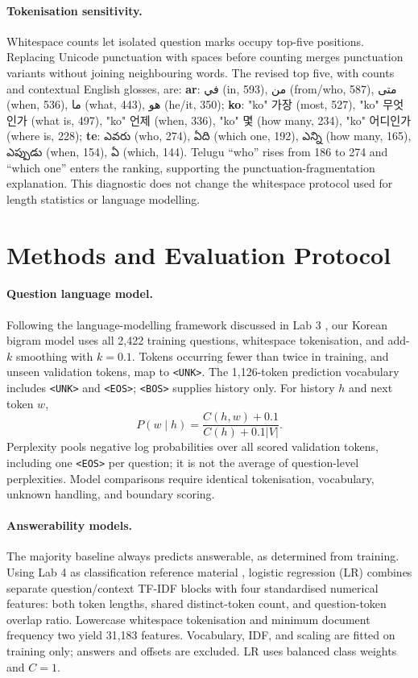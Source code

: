 \documentclass[11pt]{article}
\newcommand{\KO}[1]{{\koreanfont\XeTeXlinebreaklocale "ko" #1}}
\newcommand{\TE}[1]{{\telugufont #1}}
\newcommand{\AR}[1]{{\arabicfont\beginR #1\endR}}
\newcommand{\unk}{\texttt{<UNK>}}
\newcommand{\bos}{\texttt{<BOS>}}
\newcommand{\eos}{\texttt{<EOS>}}
\begin{document}
\paragraph{Tokenisation sensitivity.}
Whitespace counts let isolated question marks occupy top-five positions. Replacing Unicode punctuation with spaces before counting merges punctuation variants without joining neighbouring words. The revised top five, with counts and contextual English glosses, are:
\textbf{ar}: \AR{في} (in, 593), \AR{من} (from/who, 587), \AR{متى} (when, 536), \AR{ما} (what, 443), \AR{هو} (he/it, 350);
\textbf{ko}: \KO{가장} (most, 527), \KO{무엇인가} (what is, 497), \KO{언제} (when, 336), \KO{몇} (how many, 234), \KO{어디인가} (where is, 228);
\textbf{te}: \TE{ఎవరు} (who, 274), \TE{ఏది} (which one, 192), \TE{ఎన్ని} (how many, 165), \TE{ఎప్పుడు} (when, 154), \TE{ఏ} (which, 144).
Telugu ``who'' rises from 186 to 274 and ``which one'' enters the ranking, supporting the punctuation-fragmentation explanation. This diagnostic does not change the whitespace protocol used for length statistics or language modelling.

\section{Methods and Evaluation Protocol}
\paragraph{Question language model.}
Following the language-modelling framework discussed in Lab 3 \citep{lab3}, our Korean bigram model uses all 2,422 training questions, whitespace tokenisation, and add-$k$ smoothing with $k=0.1$. Tokens occurring fewer than twice in training, and unseen validation tokens, map to \unk{}. The 1,126-token prediction vocabulary includes \unk{} and \eos{}; \bos{} supplies history only. For history $h$ and next token $w$,
\begin{equation}
P(w\mid h)=\frac{C(h,w)+0.1}{C(h)+0.1|V|}.
\end{equation}
Perplexity pools negative log probabilities over all scored validation tokens, including one \eos{} per question; it is not the average of question-level perplexities. Model comparisons require identical tokenisation, vocabulary, unknown handling, and boundary scoring.

\paragraph{Answerability models.}
The majority baseline always predicts answerable, as determined from training. Using Lab 4 as classification reference material \citep{lab4}, logistic regression (LR) combines separate question/context TF-IDF blocks with four standardised numerical features: both token lengths, shared distinct-token count, and question-token overlap ratio. Lowercase whitespace tokenisation and minimum document frequency two yield 31,183 features. Vocabulary, IDF, and scaling are fitted on training only; answers and offsets are excluded. LR uses balanced class weights and $C=1$.
\end{document}
